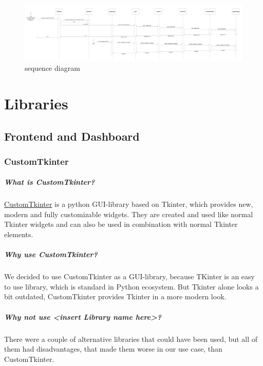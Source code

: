 \documentclass[parskip=full]{report} %
\begin{document}
\begin{figure}
\centering
\includegraphics[width=1\textwidth]
        {pictures/sequenzdiagramm.png}
  \caption{sequence diagram}
  \label{fig:sequencediagram}
\end{figure}


\chapter{Libraries}

\section{Frontend and Dashboard}

\subsection{CustomTkinter}

\paragraph{What is CustomTkinter?}
\href{https://github.com/TomSchimansky/CustomTkinter}{CustomTkinter} is a python GUI-library based on Tkinter, which provides new, modern and fully customizable widgets. They are created and used like normal Tkinter widgets and can also be used in combination with normal Tkinter elements. 

\paragraph{Why use CustomTkinter?}
We decided to use CustomTkinter as a GUI-library, because TKinter is an easy to use library, which is standard in Python ecosystem.
But Tkinter alone looks a bit outdated, CustomTkinter provides Tkinter in a more modern look.

\paragraph{Why not use <insert Library name here>?}
There were a couple of alternative libraries that could have been used, but all of them had disadvantages, that made them worse in our use case, than CustomTkinter.
  
\end{document}
